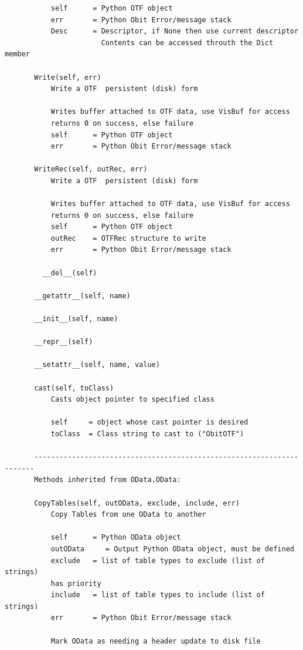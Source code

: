 \documentclass[11pt]{report}
\begin{document}
\begin{verbatim}
           self      = Python OTF object
           err       = Python Obit Error/message stack
           Desc      = Descriptor, if None then use current descriptor
                       Contents can be accessed throuth the Dict member
       
       Write(self, err)
           Write a OTF  persistent (disk) form
           
           Writes buffer attached to OTF data, use VisBuf for access
           returns 0 on success, else failure
           self      = Python OTF object
           err       = Python Obit Error/message stack
       
       WriteRec(self, outRec, err)
           Write a OTF  persistent (disk) form
           
           Writes buffer attached to OTF data, use VisBuf for access
           returns 0 on success, else failure
           self      = Python OTF object
           outRec    = OTFRec structure to write
           err       = Python Obit Error/message stack

         __del__(self)
       
       __getattr__(self, name)
       
       __init__(self, name)
       
       __repr__(self)
       
       __setattr__(self, name, value)
       
       cast(self, toClass)
           Casts object pointer to specified class
           
           self     = object whose cast pointer is desired
           toClass  = Class string to cast to ("ObitOTF")
       
       ----------------------------------------------------------------------
       Methods inherited from OData.OData:
       
       CopyTables(self, outOData, exclude, include, err)
           Copy Tables from one OData to another
           
           self      = Python OData object
           outOData     = Output Python OData object, must be defined
           exclude   = list of table types to exclude (list of strings)
           has priority
           include   = list of table types to include (list of strings)
           err       = Python Obit Error/message stack
       
           Mark OData as needing a header update to disk file
           

\end{verbatim}
\end{document}
